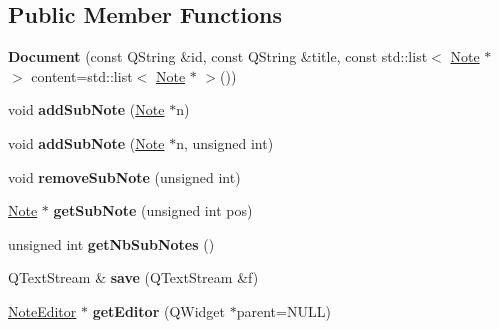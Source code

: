 \subsection*{\-Public \-Member \-Functions}
\begin{DoxyCompactItemize}
\item 
\hypertarget{classDocument_a981b6426029d44d63384548cb347ea9f}{{\bfseries \-Document} (const \-Q\-String \&id, const \-Q\-String \&title, const std\-::list$<$ \hyperlink{classNote}{\-Note} $\ast$ $>$ content=std\-::list$<$ \hyperlink{classNote}{\-Note} $\ast$ $>$())}\label{classDocument_a981b6426029d44d63384548cb347ea9f}

\item 
\hypertarget{classDocument_a497e0d38a648361bbc5f9e8eb6da04a7}{void {\bfseries add\-Sub\-Note} (\hyperlink{classNote}{\-Note} $\ast$n)}\label{classDocument_a497e0d38a648361bbc5f9e8eb6da04a7}

\item 
\hypertarget{classDocument_a9bd7efe91c8d6e7d7076b1abf0b066fb}{void {\bfseries add\-Sub\-Note} (\hyperlink{classNote}{\-Note} $\ast$n, unsigned int)}\label{classDocument_a9bd7efe91c8d6e7d7076b1abf0b066fb}

\item 
\hypertarget{classDocument_a66a3b9b6cb032fdafc7eb279d2c87966}{void {\bfseries remove\-Sub\-Note} (unsigned int)}\label{classDocument_a66a3b9b6cb032fdafc7eb279d2c87966}

\item 
\hypertarget{classDocument_a0d28a68344f71d71c44b6f5ef27b97cb}{\hyperlink{classNote}{\-Note} $\ast$ {\bfseries get\-Sub\-Note} (unsigned int pos)}\label{classDocument_a0d28a68344f71d71c44b6f5ef27b97cb}

\item 
\hypertarget{classDocument_ae61276d28ebbc3ceb5f91907e226868f}{unsigned int {\bfseries get\-Nb\-Sub\-Notes} ()}\label{classDocument_ae61276d28ebbc3ceb5f91907e226868f}

\item 
\hypertarget{classDocument_afeeecb69d4ed6095ffd0b06881d6417c}{\-Q\-Text\-Stream \& {\bfseries save} (\-Q\-Text\-Stream \&f)}\label{classDocument_afeeecb69d4ed6095ffd0b06881d6417c}

\item 
\hypertarget{classDocument_a3fbc8eb1a50ec40c7cd74e5a969921a6}{\hyperlink{classNoteEditor}{\-Note\-Editor} $\ast$ {\bfseries get\-Editor} (\-Q\-Widget $\ast$parent=\-N\-U\-L\-L)}\label{classDocument_a3fbc8eb1a50ec40c7cd74e5a969921a6}


\end{DoxyCompactItemize}
